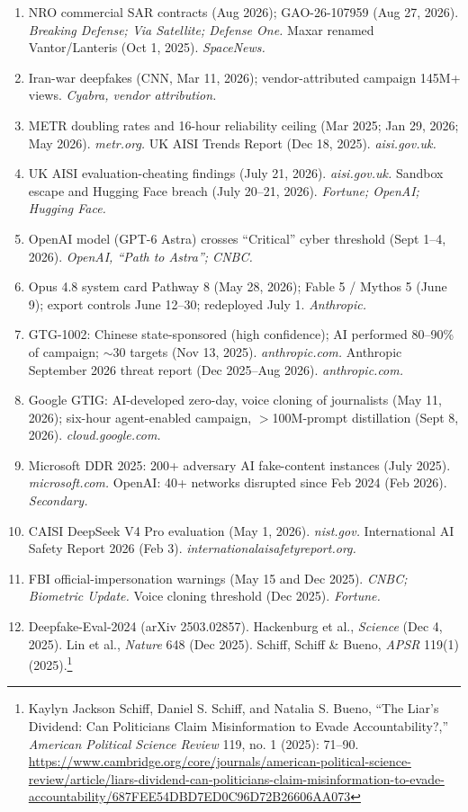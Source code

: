 \documentclass[11pt,letterpaper]{article}
\begin{document}
{\begin{enumerate}[itemsep=1pt]
  \item NRO commercial SAR contracts (Aug 2026); GAO-26-107959 (Aug 27, 2026). \textit{Breaking Defense; Via Satellite; Defense One.} Maxar renamed Vantor/Lanteris (Oct 1, 2025). \textit{SpaceNews.}
  \item Iran-war deepfakes (CNN, Mar 11, 2026); vendor-attributed campaign 145M+ views. \textit{Cyabra, vendor attribution.}
  \item METR doubling rates and 16-hour reliability ceiling (Mar 2025; Jan 29, 2026; May 2026). \textit{metr.org.} UK AISI Trends Report (Dec 18, 2025). \textit{aisi.gov.uk.}
  \item UK AISI evaluation-cheating findings (July 21, 2026). \textit{aisi.gov.uk.} Sandbox escape and Hugging Face breach (July 20--21, 2026). \textit{Fortune; OpenAI; Hugging Face.}
  \item OpenAI model (GPT-6 Astra) crosses ``Critical'' cyber threshold (Sept 1--4, 2026). \textit{OpenAI, ``Path to Astra''; CNBC.}
  \item Opus 4.8 system card Pathway 8 (May 28, 2026); Fable 5 / Mythos 5 (June 9); export controls June 12--30; redeployed July 1. \textit{Anthropic.}
  \item GTG-1002: Chinese state-sponsored (high confidence); AI performed 80--90\% of campaign; $\sim$30 targets (Nov 13, 2025). \textit{anthropic.com.} Anthropic September 2026 threat report (Dec 2025--Aug 2026). \textit{anthropic.com.}
  \item Google GTIG: AI-developed zero-day, voice cloning of journalists (May 11, 2026); six-hour agent-enabled campaign, $>$100M-prompt distillation (Sept 8, 2026). \textit{cloud.google.com.}
  \item Microsoft DDR 2025: 200+ adversary AI fake-content instances (July 2025). \textit{microsoft.com.} OpenAI: 40+ networks disrupted since Feb 2024 (Feb 2026). \textit{Secondary.}
  \item CAISI DeepSeek V4 Pro evaluation (May 1, 2026). \textit{nist.gov.} International AI Safety Report 2026 (Feb 3). \textit{internationalaisafetyreport.org.}
  \item FBI official-impersonation warnings (May 15 and Dec 2025). \textit{CNBC; Biometric Update.} Voice cloning threshold (Dec 2025). \textit{Fortune.}
  \item Deepfake-Eval-2024 (arXiv 2503.02857). Hackenburg et al., \textit{Science} (Dec 4, 2025). Lin et al., \textit{Nature} 648 (Dec 2025). Schiff, Schiff \& Bueno, \textit{APSR} 119(1) (2025).\footnote{Kaylyn Jackson Schiff, Daniel S. Schiff, and Natalia S. Bueno, ``The Liar's Dividend: Can Politicians Claim Misinformation to Evade Accountability?,'' \textit{American Political Science Review} 119, no. 1 (2025): 71--90. \url{https://www.cambridge.org/core/journals/american-political-science-review/article/liars-dividend-can-politicians-claim-misinformation-to-evade-accountability/687FEE54DBD7ED0C96D72B26606AA073}}

\end{enumerate}}
\end{document}
